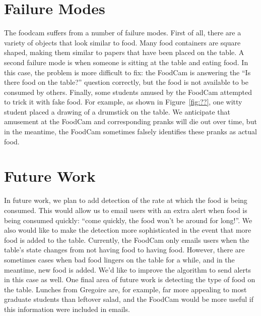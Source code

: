\section{Failure Modes}
The foodcam suffers from a number of failure modes.  First of all, there are a variety of objects
that look similar to food. Many food containers are square shaped, making them similar to
papers that have been placed on the table.  A second failure mode is when someone is sitting
at the table and eating food.  In this case, the problem is more difficult to fix: the FoodCam
is answering the ``Is there food on the table?'' question correctly, but the food is not
available to be consumed by others. Finally, some students amused by the FoodCam attempted
to trick it with fake food.  For example, as shown in Figure~\ref{fig:??}, one witty student
placed a drawing of a drumstick on the table. We anticipate that amusement at the FoodCam
and corresponding pranks will die out over time, but in the meantime, the FoodCam sometimes
falsely identifies these pranks as actual food.

\section{Future Work}
In future work, we plan to add detection of the rate at which the food is being consumed.
This would allow us to email users with an extra alert when food is being consumed quickly:
``come quickly, the food won't be around for long!''.  We also would like to make the detection
more sophisticated in the event that more food is added to the table.  Currently, the
FoodCam only emails users when the table's state changes from not having food to having food.
However, there are sometimes cases when bad food lingers on the table for a while, and in the
meantime, new food is added.  We'd like to improve the algorithm to send alerts in this case
as well. One final area of future work is detecting the type of food on the table. Lunches
from Gregoire are, for example, far more appealing to most graduate students than leftover salad,
and the FoodCam would be more useful if this information were included in emails.
